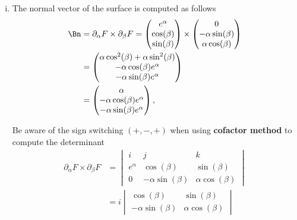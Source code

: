\documentclass[12pt]{article}
\begin{document}
\begin{enumerate}[(i)]
	\item The normal vector of the surface is computed as follows
	      \begin{align}
		      \Bn
		       & 
		      = \partial_{\alpha} F \times \partial_{\beta} F
		      = \begin{pmatrix} 
			        e^\alpha \\\cos(\beta)\\\sin(\beta)
		        \end{pmatrix}
		      \times
		      \begin{pmatrix} 
			      0 \\ -\alpha\sin(\beta) \\  \alpha\cos(\beta)
		      \end{pmatrix}                                                          \\
		       & 
		      = \begin{pmatrix} 
			        \alpha\cos^2(\beta) + \alpha\sin^2(\beta) \\ -\alpha\cos(\beta)e^\alpha\\ -\alpha\sin(\beta)e^\alpha
		        \end{pmatrix} \\
		       & 
		      = \begin{pmatrix} 
			        \alpha \\ -\alpha\cos(\beta)e^\alpha\\ -\alpha\sin(\beta)e^\alpha
		        \end{pmatrix},
	      \end{align}
	      \begin{observationboxed}
		      Be aware of the sign switching $(+,-,+)$ when using \textbf{cofactor method} to compute the determinant 
		      \begin{align}
			      \partial_{\alpha} F \times \partial_{\beta} F
			       & =
			      \begin{vmatrix}
				      i        & j                  & k                 \\
				      e^\alpha & \cos(\beta)        & \sin(\beta)       \\
				      0        & -\alpha\sin(\beta) & \alpha\cos(\beta)
			      \end{vmatrix} \\
			       & =
			      i \begin{vmatrix} \cos(\beta) & \sin(\beta) \\ -\alpha\sin(\beta) & \alpha\cos(\beta) \end{vmatrix}

\end{align}
\end{observationboxed}
\end{enumerate}
\end{document}
